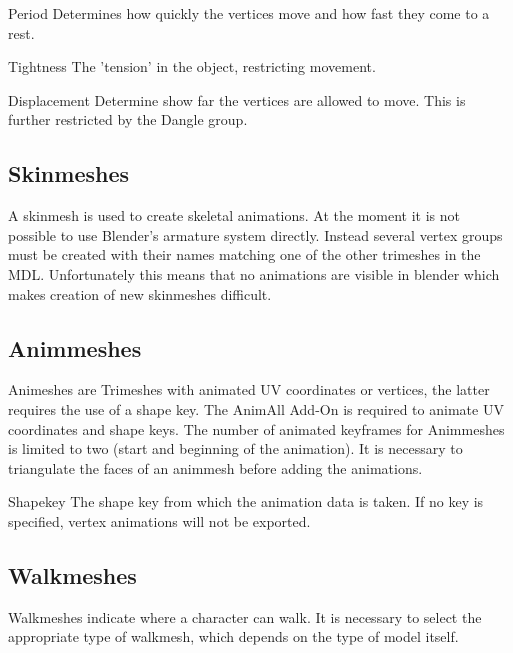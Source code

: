 \begin{propertyAurora}{Period} 
Determines how quickly the vertices move and how fast they come to a rest.
\end{propertyAurora}
\begin{propertyAurora}{Tightness} 
The 'tension' in the object, restricting movement. 
\end{propertyAurora}
\begin{propertyAurora}{Displacement} 
Determine show far the vertices are allowed to move. This is further restricted by the Dangle group.
\end{propertyAurora}


\subsection{Skinmeshes}
A skinmesh is used to create skeletal animations. At the moment it is not 
possible to use Blender's armature system directly. Instead several vertex groups 
must be created with their names matching one of the other trimeshes in the MDL. 
Unfortunately this means that no animations are visible in blender which makes
creation of new skinmeshes difficult.


\subsection{Animmeshes}
Animeshes are Trimeshes with animated UV coordinates or vertices, the latter requires the use of a 
shape key. The AnimAll Add-On is required to animate UV coordinates and shape keys. The number of 
animated keyframes for Animmeshes is limited to two (start and beginning of the animation). It is necessary 
to triangulate the faces of an animmesh before adding the animations.

\begin{propertyAurora}{Shapekey} 
    The shape key from which the animation data is taken. If no key is specified, vertex animations will
    not be exported.
\end{propertyAurora}

\subsection{Walkmeshes}
Walkmeshes indicate where a character can walk. It is necessary to select 
the appropriate type of walkmesh, which depends on the type of model itself. 

